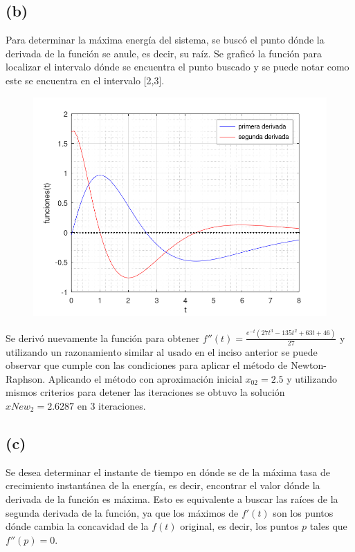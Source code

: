 \documentclass[11pt]{article}
\begin{document}
\subsection*{(b)}
Para determinar la máxima energía del sistema, se buscó el punto dónde la derivada de la función
se anule, es decir, su raíz. Se graficó la función para localizar el intervalo dónde se encuentra el punto
buscado y se puede notar como este se encuentra en el intervalo [2,3].
\begin{figure}[!h]
  \centering
  \includegraphics[scale=0.5]{incisoB.png}
\end{figure}

Se derivó nuevamente la función para obtener $f''(t)=\frac{e^{-t}(27t^3-135t^2+63t+46)}{27}$
y utilizando un razonamiento similar al usado en el inciso anterior se puede observar que cumple con las condiciones
para aplicar el método de Newton-Raphson. Aplicando el método con aproximación inicial $x_{02}=2.5$ y utilizando mismos
criterios para detener las iteraciones se obtuvo la solución $xNew_{2}=2.6287$ en 3 iteraciones.
\newpage
\subsection*{(c)}
Se desea determinar el instante de tiempo en dónde se de la máxima tasa de crecimiento instantánea
de la energía, es decir, encontrar el valor dónde la derivada de la función es máxima. Esto es equivalente
a buscar las raíces de la segunda derivada de la función, ya que los máximos de $f'(t)$ son los puntos dónde
cambia la concavidad de la $f(t)$ original, es decir, los puntos $p$ tales que $f''(p)=0$.
\end{document}
